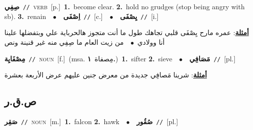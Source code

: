 \documentclass[10pt,a4paper,twoside]{article} %
\begin{document}
\begin{multicols}{2}
{\setlength\topsep{0pt}\textbf{\foreignlanguage{arabic}{صِفِي}}\ {\color{gray}\texttt{//}\color{black}}\ \textsc{verb}\ [p.]\ \textbf{1.}~become clear.  \textbf{2.}~hold no grudges (stop being angry with sb).  \textbf{3.}~renain\ \ $\bullet$\ \ \setlength\topsep{0pt}\textbf{\foreignlanguage{arabic}{اِصْفَى}}\ {\color{gray}\texttt{//}\color{black}}\ [c.]\ \ $\bullet$\ \ \setlength\topsep{0pt}\textbf{\foreignlanguage{arabic}{يِصْفَى}}\ {\color{gray}\texttt{//}\color{black}}\ [i.]\  \begin{flushright}\color{gray}\foreignlanguage{arabic}{\textbf{\underline{\foreignlanguage{arabic}{أمثلة}}}: عمره مارح يِصْفَى قلبي تجاهك طول ما أنت متجوز هالحرباية علي وبتفضلها علينا أنا وولادي\ $\bullet$\ \  من زيت العام ما صِفِي منه غير قنينة ونص}\end{flushright}\color{black}} \vspace{2mm}

{\setlength\topsep{0pt}\textbf{\foreignlanguage{arabic}{مِصْفَايِة}}\ {\color{gray}\texttt{//}\color{black}}\ \textsc{noun}\ [f.]\ \color{gray}(msa. \foreignlanguage{arabic}{مِصفاة}~\foreignlanguage{arabic}{\textbf{١.}})\color{black}\ \textbf{1.}~sifter  \textbf{2.}~sieve\ \ $\bullet$\ \ \setlength\topsep{0pt}\textbf{\foreignlanguage{arabic}{مَصَافِي}}\ {\color{gray}\texttt{//}\color{black}}\ [pl.]\  \begin{flushright}\color{gray}\foreignlanguage{arabic}{\textbf{\underline{\foreignlanguage{arabic}{أمثلة}}}: شرينا مَصافِي جديدة من معرض جنين عليهم عرض الأربعة بعشرة}\end{flushright}\color{black}} \vspace{2mm}

\vspace{-3mm}
\subsection*{\color{blue}\foreignlanguage{arabic}{ص.ق.ر}\color{blue}{}} 

{\setlength\topsep{0pt}\textbf{\foreignlanguage{arabic}{صَقِر}}\ {\color{gray}\texttt{//}\color{black}}\ \textsc{noun}\ [m.]\ \textbf{1.}~falcon  \textbf{2.}~hawk\ \ $\bullet$\ \ \setlength\topsep{0pt}\textbf{\foreignlanguage{arabic}{صُقُور}}\ {\color{gray}\texttt{//}\color{black}}\ [pl.]\ } \vspace{2mm}


\end{multicols}
\end{document}
